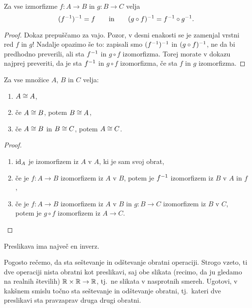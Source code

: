 \begin{trditev}
  Za vse izmorfizme $f : A \to B$ in $g : B \to C$ velja
  \begin{equation*}
    \inv{(\inv{f})} = f
    \qquad\text{in}\qquad
    \inv{(g \circ f)} = \inv{f} \circ \inv{g}.
  \end{equation*}
\end{trditev}

\begin{proof}
  Dokaz prepuščamo za vajo. Pozor, v desni enakosti se je zamenjal vrstni red $f$ in $g$!
  Nadalje opazimo še to: zapisali smo $\inv{(\inv{f})}$ in $\inv{(g \circ f)}$, ne da bi
  predhodno preverili, ali sta $\inv{f}$ in $g \circ f$ izomorfizma. Torej morate v dokazu
  najprej preveriti, da je sta $\inv{f}$ in $g \circ f$ izomorfizma, če sta $f$ in $g$
  izomorfizma.
\end{proof}

\begin{trditev}
  Za vse množice $A$, $B$ in $C$ velja:
  \begin{enumerate}
  \item $A \ism A$,
  \item če $A \ism B$, potem $B \ism A$,
  \item če $A \ism B$ in $B \ism C$, potem $A \ism C$.
  \end{enumerate}
\end{trditev}

\begin{proof}
  \parbox{0pt}{}
  \begin{enumerate}
  \item $\id[A]$ je izomorfizem iz $A$ v $A$, ki je sam svoj obrat,
  \item če je $f : A \to B$ izomorfizem iz $A$ v $B$, potem je $\inv{f}$ izomorfizem iz
    $B$ v $A$ in $f$,
  \item če je $f : A \to B$ izomorfizem iz $A$ v $B$ in $g : B \to C$ izomorfizem iz $B$ v
    $C$, potem je $g \circ f$ izomorfizem iz $A \to C$. \qedhere
  \end{enumerate}
\end{proof}

\begin{trditev}
  Preslikava ima največ en inverz.
\end{trditev}

\begin{naloga}
  Pogosto rečemo, da sta seštevanje in odštevanje obratni operaciji. Strogo vzeto, ti dve
  operaciji nista obratni kot preslikavi, saj obe slikata (recimo, da ju gledamo na
  realnih številih) $\RR \times \RR \to \RR$, tj.~ne slikata v nasprotnih smereh. Ugotovi,
  v kakšnem smislu točno sta seštevanje in odštevanje obratni, tj.~kateri dve preslikavi
  sta pravzaprav druga drugi obratni.
\end{naloga}

